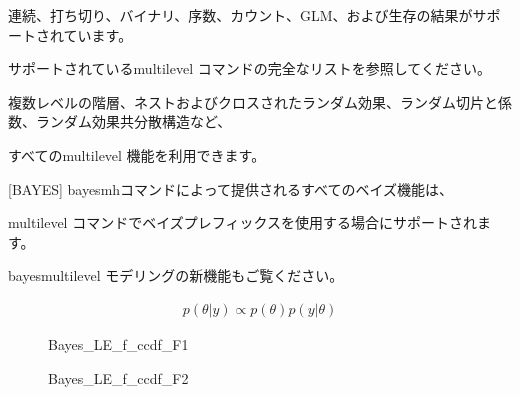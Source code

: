 \documentclass[a4j,11pt,mc, twocolumn]{jreport}
\begin{document}
	連続、打ち切り、バイナリ、序数、カウント、GLM、および生存の結果がサポートされています。

	サポートされているmultilevel コマンドの完全なリストを参照してください。

	複数レベルの階層、ネストおよびクロスされたランダム効果、ランダム切片と係数、ランダム効果共分散構造など、

	すべてのmultilevel 機能を利用できます。


	 [BAYES] bayesmhコマンドによって提供されるすべてのベイズ機能は、

	 multilevel コマンドでベイズプレフィックスを使用する場合にサポートされます。

	bayesmultilevel モデリングの新機能もご覧ください。


\begin{eqnarray}
   p(\theta|y) \propto p(\theta)p(y|\theta)
\end{eqnarray}






	\begin{figure}[h!]
		\begin{center}
				\caption{Bayes\_LE\_f\_ccdf\_F1}
		\end{center}
	\end{figure}


	\begin{figure}[h!]
		\begin{center}
				\caption{Bayes\_LE\_f\_ccdf\_F2}
		\end{center}
	\end{figure}
\end{document}
